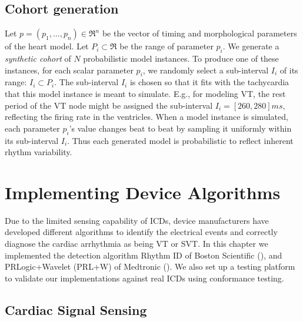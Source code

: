\subsection{Cohort generation}
\label{sec:cohort generation}
Let $p = (p_1,\ldots,p_n) \in \Re^n$ be the vector of timing and morphological parameters of the heart model.
Let $P_i \subset \Re$ be the range of parameter $p_i$.
We generate a \emph{synthetic cohort} of $N$ probabilistic model instances.
To produce one of these instances, for each scalar parameter $p_i$, we randomly select a sub-interval $I_i$ of its range: $I_i \subset P_i$.
The sub-interval $I_i$ is chosen so that it fits with the tachycardia that this model instance is meant to simulate.
E.g., for modeling VT, the rest period of the VT node might be assigned the sub-interval $I_i = [260, 280]ms$, reflecting the firing rate in the ventricles.
When a model instance is simulated, each parameter $p_i$'s value changes beat to beat by sampling it uniformly within its sub-interval $I_i$.
Thus each generated model is probabilistic to reflect inherent rhythm variability.

\section{Implementing Device Algorithms} 
\label{sec:device models}
Due to the limited sensing capability of ICDs, device manufacturers have developed different algorithms to identify the electrical events and correctly diagnose the cardiac arrhythmia as being VT or SVT.
In this chapter we implemented the detection algorithm Rhythm ID of Boston Scientific (\cite{compass,Ellenbogen11_Pacingbook}),%
and PRLogic+Wavelet (PRL+W) of Medtronic (\cite{Singer,Wavelet}).
We also set up a testing platform to validate our implementations against real ICDs using conformance testing.
\subsection{Cardiac Signal Sensing}
\label{sec:sensing}

